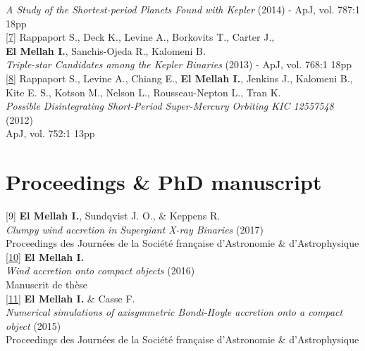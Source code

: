 \documentclass[a4paper,oneside]{article}
\begin{document}
\begin{flushleft}
\emph{A Study of the Shortest-period Planets Found with Kepler} (2014) - ApJ, vol. 787:1 18pp\\ 
\vspace*{0.3cm}
\href{http://iopscience.iop.org/article/10.1088/0004-637X/768/1/33/meta}{[7]} Rappaport S., Deck K., Levine A., Borkovits T., Carter J.,\\ \textbf{El Mellah I.}, Sanchis-Ojeda R., Kalomeni B.\\ 
\emph{Triple-star Candidates among the Kepler Binaries} (2013) - ApJ, vol. 768:1 18pp\\
\vspace*{0.3cm}
\href{http://iopscience.iop.org/article/10.1088/0004-637X/752/1/1}{[8]} Rappaport S., Levine A., Chiang E., \textbf{El Mellah I.}, Jenkins J., Kalomeni B.,\\
Kite E. S., Kotson M., Nelson L., Rousseau-Nepton L., Tran K. \\ 
\emph{Possible Disintegrating Short-Period Super-Mercury Orbiting KIC 12557548} (2012)\\
ApJ, vol. 752:1 13pp \\

\end{flushleft}

\section*{Proceedings \& PhD manuscript}

\begin{flushleft}

[9] \textbf{El Mellah I.}, Sundqvist J. O., \& Keppens R. \\ 
\emph{Clumpy wind accretion in Supergiant X-ray Binaries} (2017)\\
Proceedings des Journées de la Société fran\c caise d'Astronomie \& d'Astrophysique\\
\vspace*{0.3cm}
\href{http://adsabs.harvard.edu/abs/2017arXiv170709165E}{[10]} \textbf{El Mellah I.}\\ 
\emph{Wind accretion onto compact objects} (2016)\\
Manuscrit de thèse\\
\vspace*{0.3cm}
\href{http://adsabs.harvard.edu/abs/2015sf2a.conf..325E}{[11]} \textbf{El Mellah I.} \& Casse F. \\ 
\emph{Numerical simulations of axisymmetric Bondi-Hoyle accretion onto a compact object} (2015)\\
Proceedings des Journées de la Société fran\c caise d'Astronomie \& d'Astrophysique\\
\vspace*{0.3cm}

\end{flushleft}
\end{document}
